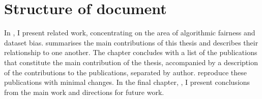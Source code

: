 \section{Structure of document}%
\label{sec:thesis-structure}
In , I present related work,
concentrating on the area of algorithmic fairness and dataset bias.
 summarises the main contributions of this thesis
and describes their relationship to one another.
The chapter concludes with a list of the publications that constitute the main contribution of the thesis,
accompanied by a description of the contributions to the publications, separated by author.
 reproduce these publications with minimal changes.
In the final chapter, , I present conclusions from the main work and directions for future work.
